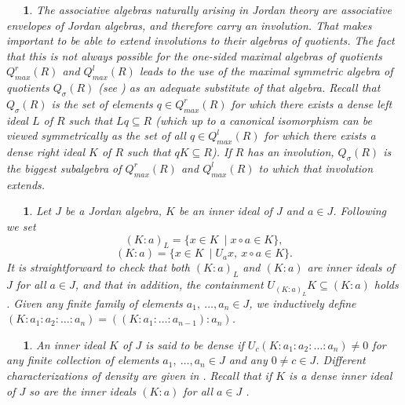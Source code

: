 \documentclass[a4paper,twoside,11pt]{article}
\theoremstyle{plain}
\theoremstyle{miestilo}
\theoremstyle{misnotas}
\newtheorem{apartado}[subsection]{\ {\ }}
\begin{document}
\begin{apartado} The associative algebras naturally arising in Jordan theory are associative
 envelopes of Jordan algebras, and therefore   carry an involution. That makes important
 to be able to extend involutions to their algebras of quotients. The fact that this is not always possible for the one-sided maximal algebras
 of quotients $Q_{max}^r(R)$ and $Q_{max}^l(R)$ leads to the  use of the maximal symmetric algebra of quotients
 $Q_\sigma(R)$ (see \cite{lanning}) as an adequate
 substitute of that algebra. Recall that $Q_\sigma(R)$  is
 the set of elements $q\in Q_{max}^r(R)$ for which there exists a
 dense left ideal $L$ of $R$ such that $Lq\subseteq R$
 (which up to a canonical isomorphism can be viewed  symmetrically as the set of all $q\in Q_{max}^l(R)$ for which there exists a
 dense right ideal $K$ of $R$ such that $qK\subseteq R$).  If $R$ has
 an involution,   $Q_\sigma(R)$ is the biggest subalgebra of $Q_{max}^r(R)$ and
 $Q_{max}^l(R)$ to which that involution extends.
 \end{apartado}


\begin{apartado}\label{new_ii} Let $J$ be a Jordan algebra, $K$ be  an inner ideal of $J$ and $a\in J$.
Following
  \cite{densos, esenciales} we set $$ (K:a)_L=\{x\in K\  \mid   x\circ a\in K  \},$$
$$ (K:a)=\{x\in K\  \mid U_ax,\ x\circ a\in K  \}.$$
It is straightforward to check that both $ (K:a)_L$ and $ (K:a)$ are  inner ideals of $J$ for
all $a\in J$, and that in addition, the containment $U_{(K:a)_L}K\subseteq (K:a)$   holds \cite[Lemma 1.2]{densos}. Given any  finite family of elements $a_1,\ \ldots, a_n\in
J$, we inductively define $(K:a_1:a_2:\ldots:a_n)=((K:a_1:\ldots
: a_{n-1}): a_n)$.\end{apartado}

\begin{apartado}\label{nii} An inner ideal $K$ of $J$ is said to be \emph{dense} if
$U_c(K:a_1:a_2:\ldots:a_n)\neq0$ for any finite collection of
elements  $a_1,\ \ldots, a_n\in J$ and any $0\neq c\in J$. Different
characterizations of density are given in \cite[Proposition 1.9]{densos}. Recall that
if $K$ is a dense inner ideal of $J$ so are the inner ideals  $(K:a)$
for all $a\in J$ \cite[Lemma 1.8]{densos}.
\end{apartado}
\end{document}

